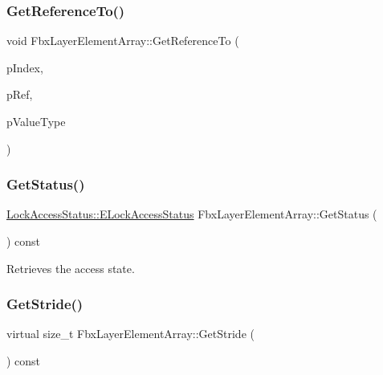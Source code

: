 \mbox{\label{class_fbx_layer_element_array_a395c044fcc5c47c6c48bb799b0a70a60}} 
\subsubsection{\texorpdfstring{Get\+Reference\+To()}{GetReferenceTo()}}
{\footnotesize\ttfamily void Fbx\+Layer\+Element\+Array\+::\+Get\+Reference\+To (\begin{DoxyParamCaption}\item[{int}]{p\+Index,  }\item[{void $\ast$$\ast$}]{p\+Ref,  }\item[{\hyperlink{fbxpropertytypes_8h_a73913a5ddfb20e57c6f25e9e6784bd92}{E\+Fbx\+Type}}]{p\+Value\+Type }\end{DoxyParamCaption})\hspace{0.3cm}{\ttfamily [protected]}}

\mbox{\label{class_fbx_layer_element_array_a5f23239e1ed76a7eab70b031c514167a}} 
\subsubsection{\texorpdfstring{Get\+Status()}{GetStatus()}}
{\footnotesize\ttfamily \hyperlink{class_lock_access_status_a3314dad01b38dd90f5393e108a07b3c1}{Lock\+Access\+Status\+::\+E\+Lock\+Access\+Status} Fbx\+Layer\+Element\+Array\+::\+Get\+Status (\begin{DoxyParamCaption}{ }\end{DoxyParamCaption}) const}



Retrieves the access state. 

\mbox{\label{class_fbx_layer_element_array_aca7d58691bf2276171658a6dc382a511}} 
\subsubsection{\texorpdfstring{Get\+Stride()}{GetStride()}}
{\footnotesize\ttfamily virtual size\+\_\+t Fbx\+Layer\+Element\+Array\+::\+Get\+Stride (\begin{DoxyParamCaption}{ }\end{DoxyParamCaption}) const\hspace{0.3cm}{\ttfamily [virtual]}}

